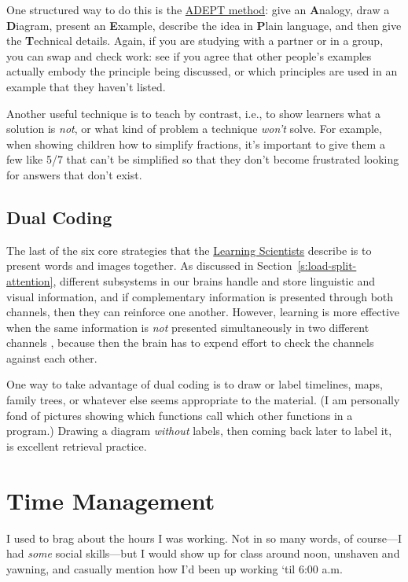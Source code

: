One structured way to do this is the \href{https://betterexplained.com/articles/adept-method/}{ADEPT method}: give an
\textbf{A}nalogy, draw a \textbf{D}iagram, present an \textbf{E}xample, describe the
idea in \textbf{P}lain language, and then give the \textbf{T}echnical details.
Again, if you are studying with a partner or in a group, you can swap
and check work: see if you agree that other people's examples actually
embody the principle being discussed, or which principles are used in
an example that they haven't listed.

Another useful technique is to teach by contrast, i.e., to show learners
what a solution is \emph{not}, or what kind of problem a technique \emph{won't}
solve. For example, when showing children how to simplify fractions,
it's important to give them a few like 5/7 that can't be simplified so
that they don't become frustrated looking for answers that don't exist.

\subsection{Dual Coding}\label{dual-coding}

The last of the six core strategies that the \href{http://www.learningscientists.org/}{Learning
Scientists} describe is to present words and
images together. As discussed in Section~\ref{s:load-split-attention},
different subsystems in our brains handle and store linguistic and
visual information, and if complementary information is presented
through both channels, then they can reinforce one another. However,
learning is more effective when the same information is \emph{not}
presented simultaneously in two different channels
\cite{Maye2003}, because then the brain has to expend effort to
check the channels against each other.

One way to take advantage of dual coding is to draw or label timelines,
maps, family trees, or whatever else seems appropriate to the material.
(I am personally fond of pictures showing which functions call which
other functions in a program.) Drawing a diagram \emph{without} labels, then
coming back later to label it, is excellent retrieval practice.

\section{Time Management}\label{s:individual-time}

I used to brag about the hours I was working. Not in so many words, of
course---I had \emph{some} social skills---but I would show up for class around
noon, unshaven and yawning, and casually mention how I'd been up working
`til 6:00 a.m.


